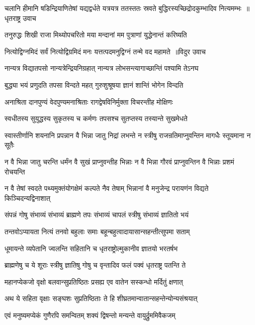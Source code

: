 \threelineshloka
{चलानि हीमानि षडिन्द्रियाणितेषां यद्यद्वर्धते यत्रयत्र}
{ततस्ततः स्रवते बुद्धिरस्यच्छिद्रोदकुम्भादिव नित्यमम्भः ॥धृतराष्ट्र उवाच}
{}


\twolineshloka
{तनुरुद्धः शिखी राजा मिथ्योपचरितो मया}
{मन्दानां मम पुत्राणां युद्धेनान्तं करिष्यति}


\threelineshloka
{नित्योद्विग्नमिदं सर्वं नित्योद्विग्रमिदं मनः}
{यत्तत्पदमनुद्विग्नं तन्मे वद महामते ॥विदुर उवाच}
{}


\twolineshloka
{नान्यत्र विद्यातपसो नान्यत्रेन्द्रियनिग्रहात्}
{नान्यत्र लोभसन्त्यागाच्छान्तिं पश्यामि तेऽनघ}


\twolineshloka
{बुद्ध्या भयं प्रणुदति तपसा विन्दते महत्}
{गुरुशुश्रूषया ज्ञानं शान्तिं भोगेन विन्दति}


\twolineshloka
{अनाश्रिता दानपुण्यं वेदपुण्यमनाश्रिताः}
{रागद्वेषविनिर्मुक्ता विचरन्तीह मोक्षिणः}


\twolineshloka
{स्वधीतस्य सुयुद्धस्य सुकृतस्य च कर्मणः}
{तपसश्च सुतप्तस्य तस्यान्ते सुखमेधते}


\twolineshloka
{स्वास्तीर्णानि शयनानि प्रपन्नान वै भिन्ना जातु निद्रां लभन्ते}
{न स्त्रीषु राजन्रतिमाप्नुवन्तिन मागधैः स्तूयमाना न सूतैः}


\twolineshloka
{न वै भिन्ना जातु चरन्ति धर्मंन वै सुखं प्राप्नुवन्तीह भिन्नाः}
{न वै भिन्ना गौरवं प्राप्नुवन्तिन वै भिन्नाः प्रशमं रोचयन्ति}


\twolineshloka
{न वै तेषां स्वदते पथ्यमुक्तंयोगक्षेमं कल्पते नैव तेषाम्}
{भिन्नानां वै मनुजेन्द्र परायणंन विद्यते किञ्चिदन्यद्विनाशात्}


\twolineshloka
{संपन्नं गोषु संभाव्यं संभाव्यं ब्राह्मणे तपः}
{संभाव्यं चापलं स्त्रीषु संभाव्यं ज्ञातितो भयं}


\twolineshloka
{तन्तवोऽप्यायता नित्यं तनवो बहुलाः समाः}
{बहून्बहुत्वादायासान्सहन्तीत्सुपमा सताम्}


\twolineshloka
{धूमायन्ते व्यपेतानि ज्वलन्ति सहितानि च}
{धृतराष्ट्रोल्मुकानीव ज्ञातयो भरतर्षभ}


\twolineshloka
{ब्राह्मणेषु च ये शूराः स्त्रीषु ज्ञातिषु गोषु च}
{वृन्तादिव फलं पक्वं धृतराष्ट्र पतन्ति ते}


\twolineshloka
{महानप्येकजो वृक्षो बलवान्सुप्रतिष्ठितः}
{प्रसह्य एव वातेन सस्कन्धो मर्दितुं क्षणात्}


\twolineshloka
{अथ ये सहिता वृक्षाः सङ्घशः सुप्रतिष्ठिताः}
{ते हि शीघ्रतमान्वातान्सहन्तेन्योन्यसंश्रयात्}


\twolineshloka
{एवं मनुष्यमप्येकं गुणैरपि समन्वितम्}
{शक्यं द्विषन्तो मन्यन्ते वायुर्द्रुममिवैकजम्}


